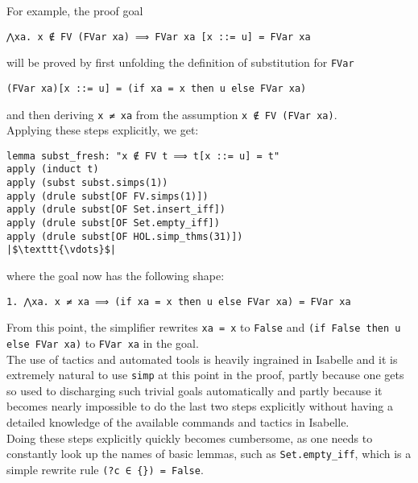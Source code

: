 \documentclass[a4paper, 12pt, twoside]{style/ociamthesis}
\theoremstyle{plain}
\theoremstyle{definition}
\newtheorem{Example}{Example}[chapter]
\theoremstyle{remark}
\renewenvironment{Example}{\begin{OldExample}\begin{mdframed}[style=example, linecolor=yellow]}{\end{mdframed}\end{OldExample}}
\begin{document}
\begin{Example}

\label{Example:substFresh} For example, the proof goal

\begin{verbatim}
⋀xa. x ∉ FV (FVar xa) ⟹ FVar xa [x ::= u] = FVar xa
\end{verbatim}

will be proved by first unfolding the definition of substitution for
\texttt{FVar}

\begin{verbatim}
(FVar xa)[x ::= u] = (if xa = x then u else FVar xa)
\end{verbatim}

and then deriving \texttt{x ≠ xa} from the assumption
\texttt{x ∉ FV (FVar xa)}.\\
Applying these steps explicitly, we get:

\begin{verbatim}
lemma subst_fresh: "x ∉ FV t ⟹ t[x ::= u] = t"
apply (induct t)
apply (subst subst.simps(1))
apply (drule subst[OF FV.simps(1)])
apply (drule subst[OF Set.insert_iff])
apply (drule subst[OF Set.empty_iff])
apply (drule subst[OF HOL.simp_thms(31)])
|$\texttt{\vdots}$|
\end{verbatim}

where the goal now has the following shape:

\begin{verbatim}
1. ⋀xa. x ≠ xa ⟹ (if xa = x then u else FVar xa) = FVar xa
\end{verbatim}

From this point, the simplifier rewrites \texttt{xa = x} to
\texttt{False} and \texttt{(if False then u else FVar xa)} to
\texttt{FVar xa} in the goal.\\
The use of tactics and automated tools is heavily ingrained in Isabelle
and it is extremely natural to use \texttt{simp} at this point in the
proof, partly because one gets so used to discharging such trivial goals
automatically and partly because it becomes nearly impossible to do the
last two steps explicitly without having a detailed knowledge of the
available commands and tactics in Isabelle.\\
Doing these steps explicitly quickly becomes cumbersome, as one needs to
constantly look up the names of basic lemmas, such as
\texttt{Set.empty\_iff}, which is a simple rewrite rule
\texttt{(?c ∈ \{\}) = False}.

\end{Example}
\end{document}
